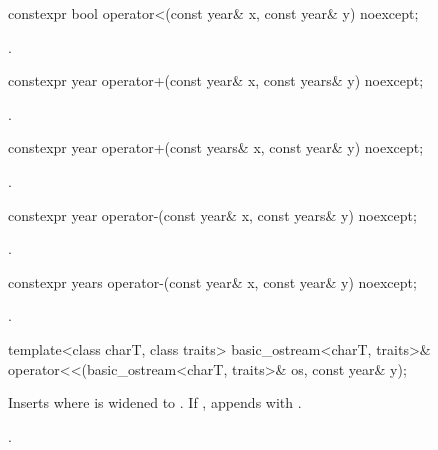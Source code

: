 %
\begin{itemdecl}
constexpr bool operator<(const year& x, const year& y) noexcept;
\end{itemdecl}

\begin{itemdescr}
\pnum
\returns {}.
\end{itemdescr}

%
\begin{itemdecl}
constexpr year operator+(const year& x, const years& y) noexcept;
\end{itemdecl}

\begin{itemdescr}
\pnum
\returns {}.
\end{itemdescr}

%
\begin{itemdecl}
constexpr year operator+(const years& x, const year& y) noexcept;
\end{itemdecl}

\begin{itemdescr}
\pnum
\returns {}.
\end{itemdescr}

%
\begin{itemdecl}
constexpr year operator-(const year& x, const years& y) noexcept;
\end{itemdecl}

\begin{itemdescr}
\pnum
\returns {}.
\end{itemdescr}

%
\begin{itemdecl}
constexpr years operator-(const year& x, const year& y) noexcept;
\end{itemdecl}

\begin{itemdescr}
\pnum
\returns {}.
\end{itemdescr}

%
\begin{itemdecl}
template<class charT, class traits>
  basic_ostream<charT, traits>&
    operator<<(basic_ostream<charT, traits>& os, const year& y);
\end{itemdecl}

\begin{itemdescr}
\pnum
\effects
Inserts  where  is
 widened to .
If , appends with .

\pnum
\returns {}.
\end{itemdescr}

